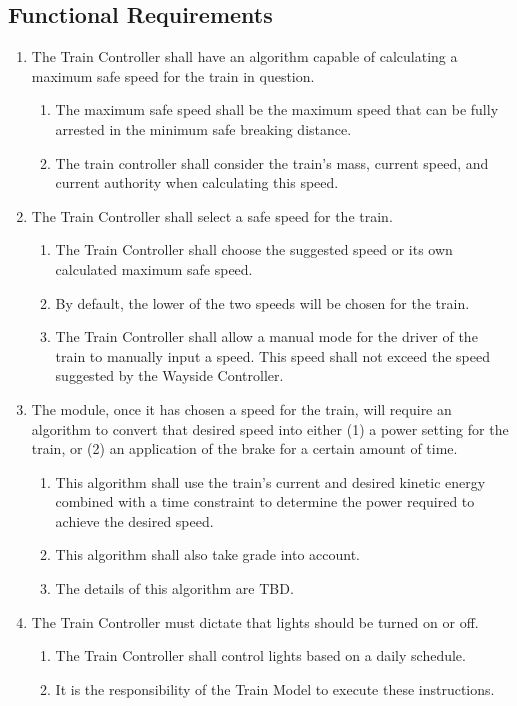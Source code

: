 \documentclass{scrreprt}
\begin{document}
\subsection{Functional Requirements}
\begin{enumerate}
    \item The Train Controller shall have an algorithm capable of calculating a maximum safe speed for the train in question.
    \begin{enumerate}
        \item The maximum safe speed shall be the maximum speed that can be fully arrested in the minimum safe breaking distance.
        \item The train controller shall consider the train's mass, current speed, and current authority when calculating this speed.
    \end{enumerate}

    \item The Train Controller shall select a safe speed for the train.
    \begin{enumerate}
        \item The Train Controller shall choose the suggested speed or its own calculated maximum safe speed.
        \item By default, the lower of the two speeds will be chosen for the train.
        \item The Train Controller shall allow a manual mode for the driver of the train to manually input a speed.  This speed shall not exceed the speed suggested by the Wayside Controller.
    \end{enumerate}

    \item The module, once it has chosen a speed for the train, will require an algorithm to convert that desired speed into either (1) a power setting for the train, or (2) an application of the brake for a certain amount of time.
    \begin{enumerate}
        \item This algorithm shall use the train's current and desired kinetic energy combined with a time constraint to determine the power required to achieve the desired speed.
        \item This algorithm shall also take grade into account.
        \item The details of this algorithm are TBD.
    \end{enumerate}

    \item The Train Controller must dictate that lights should be turned on or off.
    \begin{enumerate}
        \item The Train Controller shall control lights based on a daily schedule.
        \item It is the responsibility of the Train Model to execute these instructions.
    \end{enumerate}


\end{enumerate}
\end{document}
